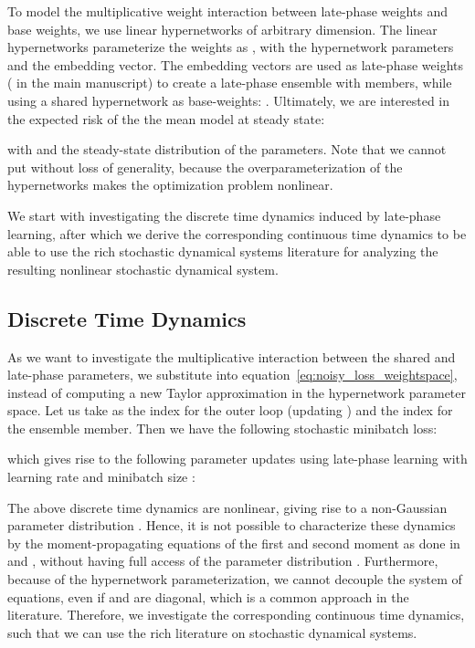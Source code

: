 \documentclass{article} \usepackage{iclr2021_conference,times}
\def\eqref#1{equation~\ref{#1}}
\begin{document}
To model the multiplicative weight interaction between late-phase weights and base weights, we use linear hypernetworks of arbitrary dimension. The linear hypernetworks parameterize the weights as , with  the hypernetwork parameters and  the embedding vector. The embedding vectors  are used as late-phase weights ( in the main manuscript) to create a late-phase ensemble with  members, while using a shared hypernetwork  as base-weights: . Ultimately, we are interested in the expected risk of the the mean model at steady state: 

with  and  the steady-state distribution of the parameters. Note that we cannot put  without loss of generality, because the overparameterization of the hypernetworks makes the optimization problem nonlinear.

We start with investigating the discrete time dynamics induced by late-phase learning, after which we derive the corresponding continuous time dynamics to be able to use the rich stochastic dynamical systems literature for analyzing the resulting nonlinear stochastic dynamical system.

\subsection{Discrete Time Dynamics}
As we want to investigate the multiplicative interaction between the shared and late-phase parameters, we substitute  into \eqref{eq:noisy_loss_weightspace}, instead of computing a new Taylor approximation in the hypernetwork parameter space. Let us take  as the index for the outer loop (updating ) and  the index for the ensemble member. Then we have the following stochastic minibatch loss:

which gives rise to the following parameter updates using late-phase learning with learning rate  and minibatch size :

The above discrete time dynamics are nonlinear, giving rise to a non-Gaussian parameter distribution . Hence, it is not possible to characterize these dynamics by the moment-propagating equations of the first and second moment as done in \citet{zhang_which_2019, zhang_lookahead_2019, schaul_no_2013} and \citet{wu_understanding_2018}, without having full access of the parameter distribution . Furthermore, because of the hypernetwork parameterization, we cannot decouple the system of equations, even if  and  are diagonal, which is a common approach in the literature. Therefore, we investigate the corresponding continuous time dynamics, such that we can use the rich literature on stochastic dynamical systems.
\end{document}
